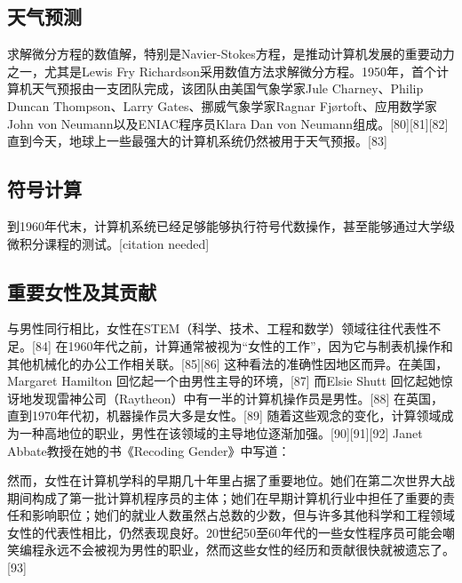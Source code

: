 \subsection{天气预测}  
求解微分方程的数值解，特别是Navier-Stokes方程，是推动计算机发展的重要动力之一，尤其是Lewis Fry Richardson采用数值方法求解微分方程。1950年，首个计算机天气预报由一支团队完成，该团队由美国气象学家Jule Charney、Philip Duncan Thompson、Larry Gates、挪威气象学家Ragnar Fjørtoft、应用数学家John von Neumann以及ENIAC程序员Klara Dan von Neumann组成。[80][81][82] 直到今天，地球上一些最强大的计算机系统仍然被用于天气预报。[83]
\subsection{符号计算}  
到1960年代末，计算机系统已经足够能够执行符号代数操作，甚至能够通过大学级微积分课程的测试。[citation needed]
\subsection{重要女性及其贡献}  
与男性同行相比，女性在STEM（科学、技术、工程和数学）领域往往代表性不足。[84] 在1960年代之前，计算通常被视为“女性的工作”，因为它与制表机操作和其他机械化的办公工作相关联。[85][86] 这种看法的准确性因地区而异。在美国，Margaret Hamilton 回忆起一个由男性主导的环境，[87] 而Elsie Shutt 回忆起她惊讶地发现雷神公司（Raytheon）中有一半的计算机操作员是男性。[88] 在英国，直到1970年代初，机器操作员大多是女性。[89] 随着这些观念的变化，计算领域成为一种高地位的职业，男性在该领域的主导地位逐渐加强。[90][91][92] Janet Abbate教授在她的书《Recoding Gender》中写道：

然而，女性在计算机学科的早期几十年里占据了重要地位。她们在第二次世界大战期间构成了第一批计算机程序员的主体；她们在早期计算机行业中担任了重要的责任和影响职位；她们的就业人数虽然占总数的少数，但与许多其他科学和工程领域女性的代表性相比，仍然表现良好。20世纪50至60年代的一些女性程序员可能会嘲笑编程永远不会被视为男性的职业，然而这些女性的经历和贡献很快就被遗忘了。[93]
